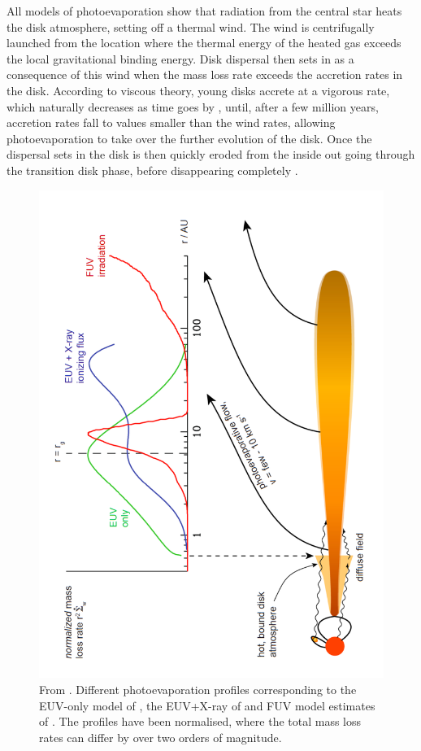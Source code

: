 \documentclass[10pt,fleqn,twoside]{article}
\begin{document}
All models of photoevaporation show that radiation from the central
star heats the disk atmosphere, setting off a thermal wind.
The wind is centrifugally launched from the location where the thermal
energy of the heated gas exceeds the local gravitational binding
energy. 
Disk dispersal then sets in as a consequence of this wind when the mass
loss rate exceeds the accretion rates in the disk. According to
viscous theory, young disks accrete
at a vigorous rate, which naturally decreases as time goes by
\citep[e.g.,][]{2008apsf.book.....H},
until,
after a few million years, accretion rates fall to values smaller than
the wind rates, allowing photoevaporation to take over the further
evolution of the disk. Once the dispersal sets in the disk is then
quickly eroded from the inside out going through the transition disk
phase, before disappearing completely
\citep[see e.g.,][for recent reviews of this process]{2014prpl.conf..475A,
2011ARA&A..49..195A}.


\begin{figure}
  \includegraphics[width=0.75\linewidth, angle = 270]{profiles.pdf}
  \caption{From \citet{2011ARA&A..49..195A}. Different photoevaporation profiles
    corresponding to the EUV-only model of \citet{2006MNRAS.369..216A, 2006MNRAS.369..229A},
    the EUV+X-ray of \citet{2010MNRAS.401.1415O} and FUV model estimates of
    \citet{2009ApJ...705.1237G}. The profiles have been
    normalised, where the total mass loss rates can differ by over two
    orders of magnitude. }
  \label{fig:profiles}
\end{figure}
\end{document}
